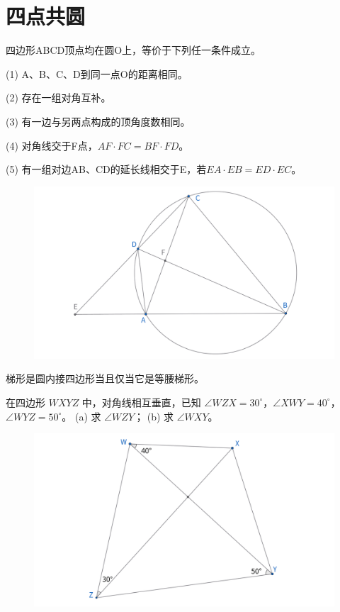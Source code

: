 \section{四点共圆}
\begin{proposition}[四点共圆判定方法]
    四边形ABCD顶点均在圆O上，等价于下列任一条件成立。

    (1) A、B、C、D到同一点O的距离相同。

    (2) 存在一组对角互补。

    (3) 有一边与另两点构成的顶角度数相同。

    (4) 对角线交于F点，$AF\cdot FC = BF\cdot FD$。

    (5) 有一组对边AB、CD的延长线相交于E，若$EA\cdot EB = ED\cdot EC$。
\end{proposition}
\begin{figure}[H]
    \centering
    \includegraphics[width=\linewidth]{figures/四点共圆.png}
\end{figure}


\begin{exercise}
梯形是圆内接四边形当且仅当它是等腰梯形。
\end{exercise}


\begin{exercise}
在四边形 $WXYZ$ 中，对角线相互垂直，已知 $\angle WZX = 30^\circ$，$\angle XWY = 40^\circ$，$\angle WYZ = 50^\circ$。
(a) 求 $\angle WZY$；
(b) 求 $\angle WXY$。
\end{exercise}

\begin{figure}[H]
    \centering
    \includegraphics[width=0.7\linewidth]{figures/exercises/003.png}
\end{figure}

